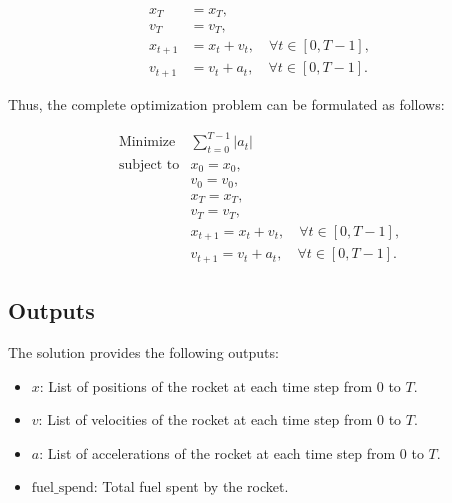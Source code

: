 \documentclass{article}
\begin{document}
\begin{align}
    x_{T} &= x_T, \\
    v_{T} &= v_T, \\
    x_{t+1} &= x_t + v_t, \quad \forall t \in [0, T-1], \\
    v_{t+1} &= v_t + a_t, \quad \forall t \in [0, T-1].
\end{align}

Thus, the complete optimization problem can be formulated as follows:

\[
\begin{array}{ll}
\text{Minimize} & \sum_{t=0}^{T-1} |a_t| \\
\text{subject to} & x_{0} = x_0, \\
                  & v_{0} = v_0, \\
                  & x_{T} = x_T, \\
                  & v_{T} = v_T, \\
                  & x_{t+1} = x_t + v_t, \quad \forall t \in [0, T-1], \\
                  & v_{t+1} = v_t + a_t, \quad \forall t \in [0, T-1].
\end{array}
\]

\subsection*{Outputs}

The solution provides the following outputs:

\begin{itemize}
    \item \( x \): List of positions of the rocket at each time step from \( 0 \) to \( T \).
    \item \( v \): List of velocities of the rocket at each time step from \( 0 \) to \( T \).
    \item \( a \): List of accelerations of the rocket at each time step from \( 0 \) to \( T \).
    \item \( \text{fuel\_spend} \): Total fuel spent by the rocket.
\end{itemize}
\end{document}
